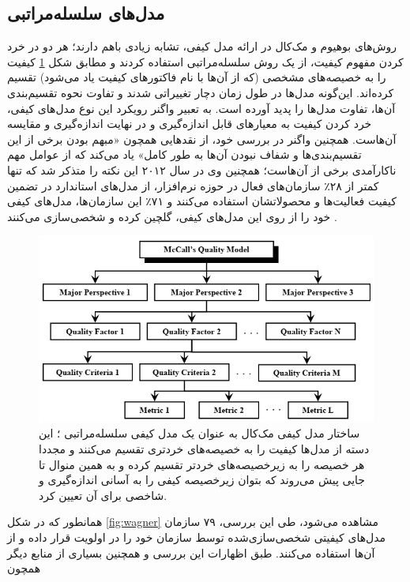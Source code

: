 \subsection{مدل‌های سلسله‌مراتبی}
روش‌های بوهیوم
\cite{boehm_quantitative_1976}
و مک‌کال
\cite{mccall_factors_1977}
در ارائه مدل کیفی، تشابه زیادی باهم دارند؛ هر دو در خرد کردن مفهوم کیفیت، از یک روش سلسله‌مراتبی استفاده کردند و مطابق شکل
\ref{fig:heir}
کیفیت را به خصیصه‌های مشخصی (که از آن‌ها با نام فاکتورهای کیفیت یاد می‌شود) تقسیم کرده‌اند. این‌گونه مدل‌ها در طول زمان دچار تغییراتی شدند و تفاوت نحوه تقسیم‌بندی آن‌ها، تفاوت مدل‌ها را پدید آورده است.
به تعبیر واگنر
\cite{wagner_software_2013}
رویکرد این نوع مدل‌های کیفی، خرد کردن کیفیت به معیارهای قابل اندازه‌گیری و در نهایت اندازه‌گیری و مقایسه آن‌هاست. همچنین واگنر در بررسی خود، از نقدهایی همچون «مبهم بودن برخی از این تقسیم‌بندی‌ها و شفاف نبودن آن‌ها به طور کامل» یاد می‌کند که از عوامل مهم ناکارآمدی برخی از آن‌هاست؛ همچنین وی در سال ۲۰۱۲ این نکته را متذکر شد که تنها کمتر از ۲۸٪ سازمان‌های فعال در حوزه نرم‌افزار، از مدل‌های استاندارد در تضمین کیفیت فعالیت‌ها و محصولاتشان استفاده می‌کنند و ۷۱٪ این سازمان‌ها، مدل‌های کیفی خود را از روی این مدل‌های کیفی، گلچین کرده و شخصی‌سازی می‌کنند
\cite{wagner_software_2012}.
\begin{figure}
	\centering\includegraphics[width=11	cm]{Resources/heir.PNG}
	\caption[ساختار مدل کیفی مک‌کال به عنوان یک مدل کیفی سلسله‌مراتبی]
	{ساختار مدل کیفی مک‌کال به عنوان یک مدل کیفی سلسله‌مراتبی
		\cite{al-qutaish_quality_2010}؛
		این دسته از مدل‌ها کیفیت را به خصیصه‌های خردتری تقسیم می‌کنند و مجددا هر خصیصه را به زیرخصیصه‌های خردتر تقسیم کرده و به همین منوال تا جایی پیش می‌روند که بتوان زیرخصیصه کیفی را به آسانی اندازه‌گیری و شاخصی برای آن تعیین کرد.
	}
	\label{fig:heir}
\end{figure}
همانطور که در شکل
\ref{fig:wagner}
مشاهده می‌شود، طی این بررسی، ۷۹ سازمان مدل‌های کیفیتی شخصی‌سازی‌شده توسط سازمان خود را در اولویت قرار داده و از آن‌ها استفاده می‌کنند. طبق اظهارات این بررسی و همچنین بسیاری از منابع دیگر همچون
